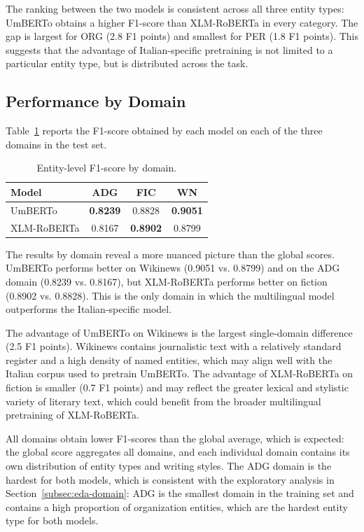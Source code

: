 The ranking between the two models is consistent across all three entity types: UmBERTo obtains a higher F1-score than XLM-RoBERTa in every category. The gap is largest for ORG (2.8 F1 points) and smallest for PER (1.8 F1 points). This suggests that the advantage of Italian-specific pretraining is not limited to a particular entity type, but is distributed across the task.

\subsection{Performance by Domain}
\label{subsec:eval-domain}

Table~\ref{tab:eval-domain} reports the F1-score obtained by each model on each of the three domains in the test set.

\begin{table}[H]
    \centering
    \caption{Entity-level F1-score by domain.}
    \label{tab:eval-domain}
    \begin{tabular}{lccc}
        \hline
        \textbf{Model} & \textbf{ADG} & \textbf{FIC} & \textbf{WN} \\
        \hline
        UmBERTo & \textbf{0.8239} & 0.8828 & \textbf{0.9051} \\
        XLM-RoBERTa & 0.8167 & \textbf{0.8902} & 0.8799 \\
        \hline
    \end{tabular}
\end{table}

The results by domain reveal a more nuanced picture than the global scores. UmBERTo performs better on Wikinews (0.9051 vs. 0.8799) and on the ADG domain (0.8239 vs. 0.8167), but XLM-RoBERTa performs better on fiction (0.8902 vs. 0.8828). This is the only domain in which the multilingual model outperforms the Italian-specific model.

The advantage of UmBERTo on Wikinews is the largest single-domain difference (2.5 F1 points). Wikinews contains journalistic text with a relatively standard register and a high density of named entities, which may align well with the Italian corpus used to pretrain UmBERTo. The advantage of XLM-RoBERTa on fiction is smaller (0.7 F1 points) and may reflect the greater lexical and stylistic variety of literary text, which could benefit from the broader multilingual pretraining of XLM-RoBERTa.

All domains obtain lower F1-scores than the global average, which is expected: the global score aggregates all domains, and each individual domain contains its own distribution of entity types and writing styles. The ADG domain is the hardest for both models, which is consistent with the exploratory analysis in Section~\ref{subsec:eda-domain}: ADG is the smallest domain in the training set and contains a high proportion of organization entities, which are the hardest entity type for both models.


